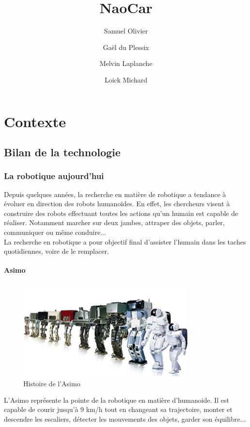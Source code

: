 \documentclass[11pt]{report} %
\title{NaoCar}
\author{Samuel Olivier\and
Gaël du Plessix\and
Melvin Laplanche\and
Loick Michard}
\begin{document}
\maketitle
\tableofcontents

\chapter{Contexte}
	\section{Bilan de la technologie}
		\subsection{La robotique aujourd'hui}
			Depuis quelques années, la recherche en matière de robotique a tendance à évoluer en direction des robots humanoïdes.
			En effet, les chercheurs visent à construire des robots effectuant toutes les actions qu'un humain est capable de réaliser.
			Notamment marcher sur deux jambes, attraper des objets, parler, communiquer ou même conduire...\\
			La recherche en robotique a pour objectif final d'assister l'humain dans les taches quotidiennes, voire de le remplacer.
			\subsubsection{Asimo}
				\begin{figure}[htb]
				\centering
				\includegraphics[width=0.8\textwidth]{asimo-history.jpg}
				\caption{Histoire de l'Asimo}
				\label{fig:asimo}
				\end{figure}
				\newpage
				L'Asimo représente la pointe de la robotique en matière d'humanoide.
				Il est capable de courir jusqu'à 9 km/h tout en changeant sa trajectoire, monter et descendre les escaliers, détecter les mouvements des objets, garder son équilibre...
\end{document}
